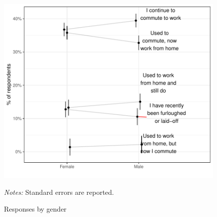 \documentclass[12pt]{article}
\begin{document}
\begin{figure}
  \caption{Responses by gender} \label{fig:gender}
\centering
\begin{minipage}{1.0 \linewidth}
  \includegraphics[width = \linewidth]{plots/gender.pdf} \\
  \begin{footnotesize}
    \begin{singlespace}
      \emph{Notes:} Standard errors are reported. 
    \end{singlespace}
    \end{footnotesize}
\end{minipage}
\end{figure} 
\end{document}
